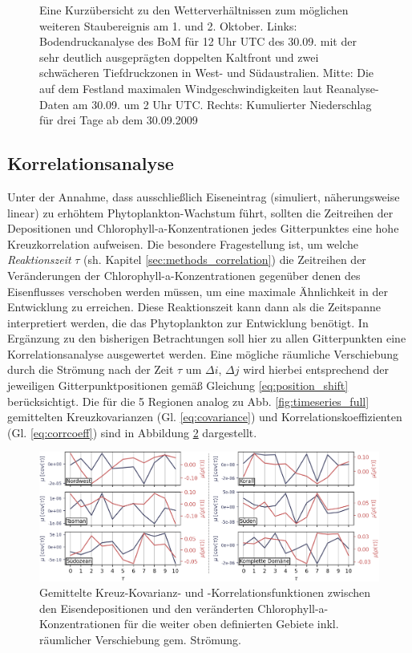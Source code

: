 \documentclass[12pt,a4paper,onecolumn,headheight=30pt]{scrartcl}
\begin{document}
\begin{figure}[htbp]
\begin{minipage}[c]{0.33\textwidth}
	\end{minipage}\hfill
	\caption{Eine Kurzübersicht zu den Wetterverhältnissen zum möglichen weiteren Staubereignis am 1. und 2. Oktober. Links: Bodendruckanalyse des BoM für 12 Uhr UTC des 30.09. mit der sehr deutlich ausgeprägten doppelten Kaltfront und zwei schwächeren Tiefdruckzonen in West- und Südaustralien. Mitte: Die auf dem Festland maximalen Windgeschwindigkeiten laut Reanalyse-Daten am 30.09. um 2 Uhr UTC. Rechts: Kumulierter Niederschlag für drei Tage ab dem 30.09.2009} \label{fig:october_weather}
\end{figure}
\subsection{Korrelationsanalyse} \label{sec:correlation_analysis}
Unter der Annahme, dass ausschließlich Eiseneintrag (simuliert, näherungsweise linear) zu erhöhtem Phytoplankton-Wachstum führt, sollten die Zeitreihen der Depositionen und Chlorophyll-a-Konzentrationen jedes Gitterpunktes eine hohe Kreuzkorrelation aufweisen. Die besondere Fragestellung ist, um welche \textit{Reaktionszeit} $\tau$ (sh. Kapitel \ref{sec:methods_correlation}) die Zeitreihen der Veränderungen der Chlorophyll-a-Konzentrationen gegenüber denen des Eisenflusses verschoben werden müssen, um eine maximale Ähnlichkeit in der Entwicklung zu erreichen. Diese Reaktionszeit kann dann als die Zeitspanne interpretiert werden, die das Phytoplankton zur Entwicklung benötigt. In Ergänzung zu den bisherigen Betrachtungen soll hier zu allen Gitterpunkten eine Korrelationsanalyse ausgewertet werden. Eine mögliche räumliche Verschiebung durch die Strömung nach der Zeit $\tau$ um $\Delta i$, $\Delta j$ wird hierbei entsprechend der jeweiligen Gitterpunktpositionen gemäß Gleichung \ref{eq:position_shift} berücksichtigt. Die für die 5 Regionen analog zu Abb. \ref{fig:timeseries_full} gemittelten Kreuzkovarianzen (Gl. \ref{eq:covariance}) und Korrelationskoeffizienten (Gl. \ref{eq:corrcoeff}) sind in Abbildung \ref{fig:section_cross_corr} dargestellt.
\begin{figure}[htbp]
\includegraphics[width=\textwidth]{bilder/section_crosscorr_noadv.png}
\caption{Gemittelte Kreuz-Kovarianz- und -Korrelationsfunktionen zwischen den Eisendepositionen und den veränderten Chlorophyll-a-Konzentrationen für die weiter oben definierten Gebiete inkl. räumlicher Verschiebung gem. Strömung.} \label{fig:section_cross_corr}
\end{figure}
\end{document}
